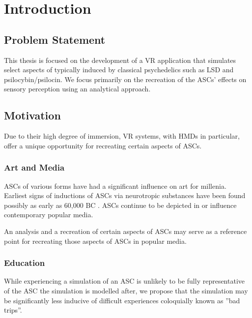 \chapter{Introduction}
\vspace{-1.6em}
%

\minitoc
\thispagestyle{empty}
\newpage

\section{Problem Statement}
This thesis is focused on the development of a \ac{VR} application that simulates select aspects of  typically induced by classical psychedelics such as LSD and psilocybin/psilocin.
We focus primarily on the recreation of the \acp{ASC}' effects on sensory perception using an analytical approach.

\section{Motivation}
Due to their high degree of immersion, \ac{VR} systems, with \acp{HMD} in particular, offer a unique opportunity for recreating certain aspects of \acp{ASC}.

\subsection{Art and Media}
\Acp{ASC} of various forms have had a significant influence on art for millenia. Earliest signs of inductions of \acp{ASC} via neurotropic substances have been found possibly as early as 60,000 BC \autocite{guerra2015psychoactive}. \Acp{ASC} continue to be depicted in or influence contemporary popular media.

An analysis and a recreation of certain aspects of \acp{ASC} may serve as a reference point for recreating those aspects of \acp{ASC} in popular media.

\subsection{Education}
While experiencing a simulation of an \ac{ASC} is unlikely to be fully representative of the \ac{ASC} the simulation is modelled after, we propose that the simulation may be significantly less inducive of difficult experiences coloquially known as ''bad trips''.

